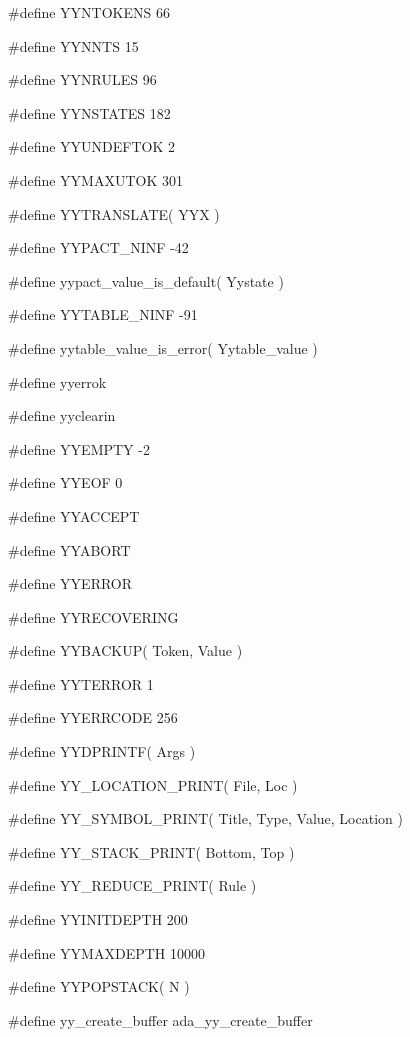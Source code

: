 \medskip
{\stt \#define YYNTOKENS 66}

\medskip
{\stt \#define YYNNTS 15}

\medskip
{\stt \#define YYNRULES 96}

\medskip
{\stt \#define YYNSTATES 182}

\medskip
{\stt \#define YYUNDEFTOK 2}

\medskip
{\stt \#define YYMAXUTOK 301}

\medskip
{\stt \#define YYTRANSLATE( YYX )}

\medskip
{\stt \#define YYPACT\_NINF -42}

\medskip
{\stt \#define yypact\_value\_is\_default( Yystate )}

\medskip
{\stt \#define YYTABLE\_NINF -91}

\medskip
{\stt \#define yytable\_value\_is\_error( Yytable\_value )}

\medskip
{\stt \#define yyerrok}

\medskip
{\stt \#define yyclearin}

\medskip
{\stt \#define YYEMPTY -2}

\medskip
{\stt \#define YYEOF 0}

\medskip
{\stt \#define YYACCEPT}

\medskip
{\stt \#define YYABORT}

\medskip
{\stt \#define YYERROR}

\medskip
{\stt \#define YYRECOVERING}

\medskip
{\stt \#define YYBACKUP( Token, Value )}

\medskip
{\stt \#define YYTERROR 1}

\medskip
{\stt \#define YYERRCODE 256}

\medskip
{\stt \#define YYDPRINTF( Args )}

\medskip
{\stt \#define YY\_LOCATION\_PRINT( File, Loc )}

\medskip
{\stt \#define YY\_SYMBOL\_PRINT( Title, Type, Value, Location )}

\medskip
{\stt \#define YY\_STACK\_PRINT( Bottom, Top )}

\medskip
{\stt \#define YY\_REDUCE\_PRINT( Rule )}

\medskip
{\stt \#define YYINITDEPTH 200}

\medskip
{\stt \#define YYMAXDEPTH 10000}

\medskip
{\stt \#define YYPOPSTACK( N )}

\medskip
{\stt \#define yy\_create\_buffer ada\_yy\_create\_buffer}

